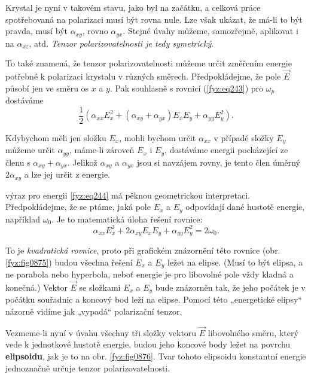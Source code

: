     Krystal je nyní v takovém stavu, jako byl na začátku, a celková práce spotřebovaná na polarizaci
    musí být rovna nule. Lze však ukázat, že má-li to být pravda, musí být \(\alpha_{xy}\), rovno
    \(\alpha_{yx}\). Stejné úvahy můžeme, samozřejmě, aplikovat i na \(\alpha_{xz}\), atd.
    \emph{Tenzor polarizovatelnosti je tedy symetrický}.

    To také znamená, že tenzor polarizovatelnosti můžeme určit změřením energie potřebné k
    polarizaci krystalu v různých směrech. Předpokládejme, že pole \(\vec{E}\) působí jen ve směru
    os \(x\) a \(y\). Pak souhlasně s rovnicí (\ref{fyz:eq243}) pro \(\omega_p\) dostáváme
    \begin{equation}\label{fyz:eq244}
      \frac{1}{2}\left(\alpha_{xx}E_x^2 + (\alpha_{xy} + \alpha_{yx})E_xE_y + \alpha_{yy}E_y^2\right).
    \end{equation}

    Kdybychom měli jen složku \(E_x\), mohli bychom určit \(\alpha_{xx}\) v případě složky \(E_y\)
    můžeme určit \(\alpha_{yy}\), máme-li zároveň \(E_x\) i \(E_y\), dostáváme energii pocházející
    ze členu s \(\alpha_{xy} + \alpha_{yx}\). Jelikož \(\alpha_{xy}\) a \(\alpha_{yx}\) jsou si
    navzájem rovny, je tento člen úměrný \(2\alpha_{xy}\) a lze jej určit z energie.

    výraz pro energii \eqref{fyz:eq244} má pěknou geometrickou interpretaci. Předpokládejme, že se
    ptáme, jaká pole \(E_x\) a \(E_y\) odpovídají dané hustotě energie, například \(\omega_0\). Je
    to matematická úloha řešení rovnice:
    \begin{equation*}
      \alpha_{xx}E_x^2 + 2\alpha_{xy}E_xE_y + \alpha_{yy}E_y^2 = 2\omega_0.
    \end{equation*}

    To je \emph{kvadratická rovnice}, proto při grafickém znázornění této rovnice (obr.
    \ref{fyz:fig0875}) budou všechna řešení \(E_x\) a \(E_y\) ležet na elipse. (Musí to být elipsa, a
    ne parabola nebo hyperbola, neboť energie je pro libovolné pole vždy kladná a konečná.) Vektor
    \(\vec{E}\) se složkami \(E_x\) a \(E_y\) bude znázorněn tak, že jeho počátek je v počátku
    souřadnic a koncový bod leží na elipse. Pomocí této „energetické elipsy“ názorně vidíme jak
    „vypadá“ polarizační tenzor.

    
    Vezmeme-li nyní v úvahu všechny tři složky vektoru \(\vec{E}\) libovolného směru, který vede k
    jednotkové hustotě energie, budou jeho koncové body ležet na povrchu \textbf{elipsoidu}, jak je
    to na obr. \ref{fyz:fig0876}. Tvar tohoto elipsoidu konstantní energie jednoznačně určuje tenzor
    polarizovatelnosti.

